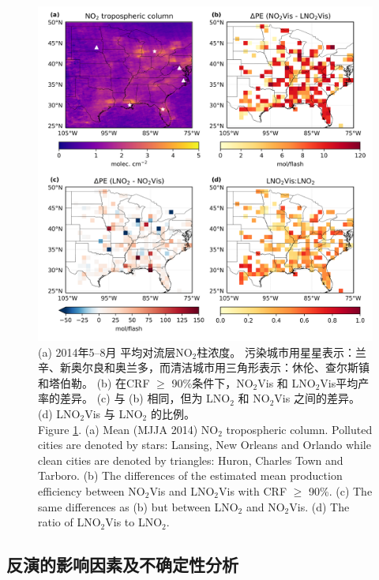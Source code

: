 \begin{figure}[!htbp]
\centering
\includegraphics[width=13cm]{./figures/us_delta.png}
\caption{(a) 2014年5--8月  平均对流层NO$_\textrm{2}$柱浓度。
污染城市用星星表示：兰辛、新奥尔良和奥兰多，而清洁城市用三角形表示：休伦、查尔斯镇和塔伯勒。
(b) 在CRF $\geq$ 90\%条件下，NO$_\textrm{2}$Vis 和 LNO$_\textrm{2}$Vis平均产率的差异。
(c) 与 (b) 相同，但为 LNO$_\textrm{2}$ 和 NO$_\textrm{2}$Vis 之间的差异。
(d) LNO$_\textrm{2}$Vis 与 LNO$_\textrm{2}$ 的比例。\\
Figure \ref{fig:us_delta}.
(a) Mean (MJJA 2014) NO$_\textrm{2}$ tropospheric column.
Polluted cities are denoted by stars: Lansing, New Orleans and Orlando while clean cities are denoted by triangles: Huron, Charles Town and Tarboro.
(b) The differences of the estimated mean production efficiency between NO$_\textrm{2}$Vis and LNO$_\textrm{2}$Vis with CRF $\geq$ 90\%.
(c) The same differences as (b) but between LNO$_\textrm{2}$ and NO$_\textrm{2}$Vis.
(d) The ratio of LNO$_\textrm{2}$Vis to LNO$_\textrm{2}$.
}
\label{fig:us_delta}
\end{figure}

\subsection{反演的影响因素及不确定性分析} \label{sec:uncertainty}

